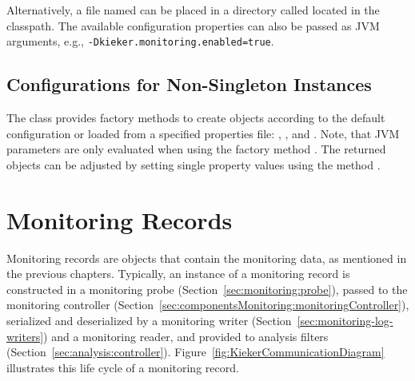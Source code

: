 \noindent Alternatively, a file named  %
can be placed in a directory called  located in the classpath. %
The available configuration properties can also be passed as JVM %
arguments, e.g., \lstinline{-Dkieker.monitoring.enabled=true}. %

\subsection*{Configurations for Non-Singleton Instances}

The class  provides factory methods to create %
 objects according to the default configuration %
or loaded from a specified properties file: , %
, and . %
Note, that JVM parameters are only evaluated when using the factory method %
. %
The returned  objects can be adjusted by setting %
single property values using the method . %

\section{Monitoring Records}\label{sec:componentsMonitoring:monitoringRecords}

Monitoring records are objects that contain the monitoring data, as mentioned %
in the previous chapters. Typically, an instance of a monitoring record is %
constructed in a monitoring probe (Section~\ref{sec:monitoring:probe}), %
passed to the monitoring controller (Section~\ref{sec:componentsMonitoring:monitoringController}), %
serialized and deserialized by a monitoring %
writer (Section~\ref{sec:monitoring-log-writers}) and a
monitoring reader, and provided to analysis filters (Section~\ref{sec:analysis:controller}). %
Figure~\ref{fig:KiekerCommunicationDiagram} illustrates this life cycle of a monitoring %
record. %

